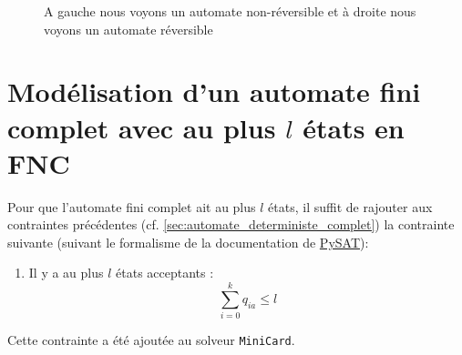 \documentclass[a4paper, 12pt]{extarticle}
\begin{document}
\begin{figure}[H]
    \centering
    \hspace{4cm}
    \caption{A gauche nous voyons un automate non-réversible et à droite nous voyons un automate réversible}
\end{figure}
    
\section{Modélisation d'un automate fini complet avec au plus $l$ états en FNC}
\noindent Pour que l'automate fini complet ait au plus $l$ états, il suffit de rajouter aux contraintes précédentes (cf. \ref{sec:automate_deterministe_complet}) 
la contrainte suivante (suivant le formalisme de la documentation de \href{https://pysathq.github.io/docs/html/api/solvers.html#pysat.solvers.Solver.add_atmost}{PySAT}):
\begin{enumerate}
    \item Il y a au plus $l$ états acceptants :
    \begin{equation*}
        \sum_{i=0}^{k} q_{ia} \le l
    \end{equation*}
\end{enumerate}
Cette contrainte a été ajoutée au solveur \texttt{MiniCard}.


\section{}
\end{document}
